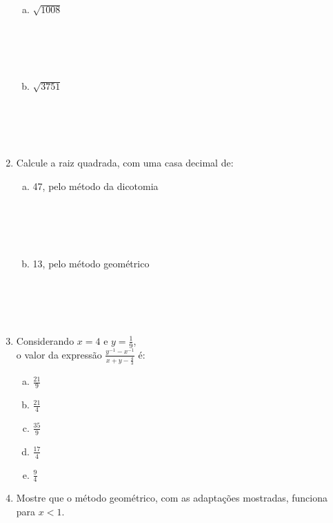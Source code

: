 \documentclass[a4paper,14pt]{article}
\begin{document}
\begin{multicols}{2}
\begin{enumerate}
\begin{enumerate}[a)]
            	\item $\sqrt{1008}$ \\\\\\\\\\
            	\item $\sqrt{3751}$ \\\\\\\\\\
            \end{enumerate}
            \item Calcule a raiz quadrada, com uma casa decimal de:
            \begin{enumerate}[a)]
            	\item 47, pelo método da dicotomia \\\\\\\\\\
            	\item 13, pelo método geométrico \\\\\\\\\\
            \end{enumerate}
            \item Considerando $x=4$ e $y=\frac{1}{9}$,\\ o valor da expressão $\frac{y^{-1} - x^{-1}}{x + y - \frac{4}{3}}$ é:
            \begin{enumerate}[a)]
            	\item $\frac{21}{9}$
            	\item $\frac{21}{4}$
            	\item $\frac{35}{9}$
            	\item $\frac{17}{4}$
            	\item $\frac{9}{4}$
            \end{enumerate}
            \item Mostre que o método geométrico, com as adaptações mostradas, funciona para $x < 1$.
	    \end{enumerate}

\end{multicols}
\end{document}
